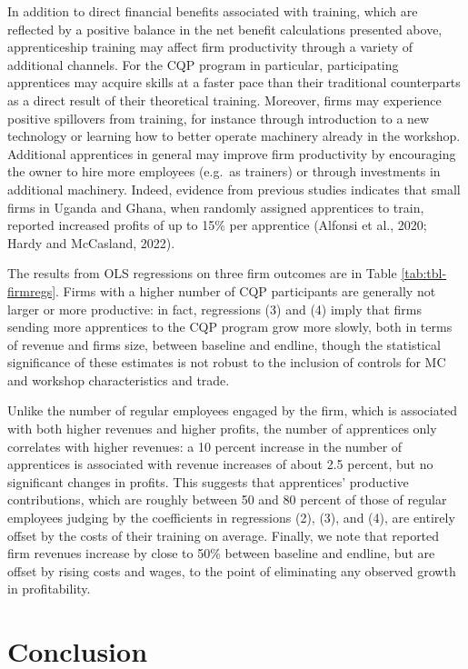 \documentclass[
  11pt,
a4paper
]{article}
\begin{document}
\noindent In addition to direct financial benefits associated with training, which are reflected by a positive balance in the net benefit calculations presented above, apprenticeship training may affect firm productivity through a variety of additional channels. For the CQP program in particular, participating apprentices may acquire skills at a faster pace than their traditional counterparts as a direct result of their theoretical training. Moreover, firms may experience positive spillovers from training, for instance through introduction to a new technology or learning how to better operate machinery already in the workshop. Additional apprentices in general may improve firm productivity by encouraging the owner to hire more employees (e.g.~as trainers) or through investments in additional machinery. Indeed, evidence from previous studies indicates that small firms in Uganda and Ghana, when randomly assigned apprentices to train, reported increased profits of up to 15\% per apprentice (Alfonsi et al., 2020; Hardy and McCasland, 2022).

The results from OLS regressions on three firm outcomes are in Table \ref{tab:tbl-firmregs}. Firms with a higher number of CQP participants are generally not larger or more productive: in fact, regressions (3) and (4) imply that firms sending more apprentices to the CQP program grow more slowly, both in terms of revenue and firms size, between baseline and endline, though the statistical significance of these estimates is not robust to the inclusion of controls for MC and workshop characteristics and trade.

Unlike the number of regular employees engaged by the firm, which is associated with both higher revenues and higher profits, the number of apprentices only correlates with higher revenues: a 10 percent increase in the number of apprentices is associated with revenue increases of about 2.5 percent, but no significant changes in profits. This suggests that apprentices' productive contributions, which are roughly between 50 and 80 percent of those of regular employees judging by the coefficients in regressions (2), (3), and (4), are entirely offset by the costs of their training on average. Finally, we note that reported firm revenues increase by close to 50\% between baseline and endline, but are offset by rising costs and wages, to the point of eliminating any observed growth in profitability.

\hypertarget{conclusion}{%
\section{Conclusion}\label{conclusion}}
\end{document}
